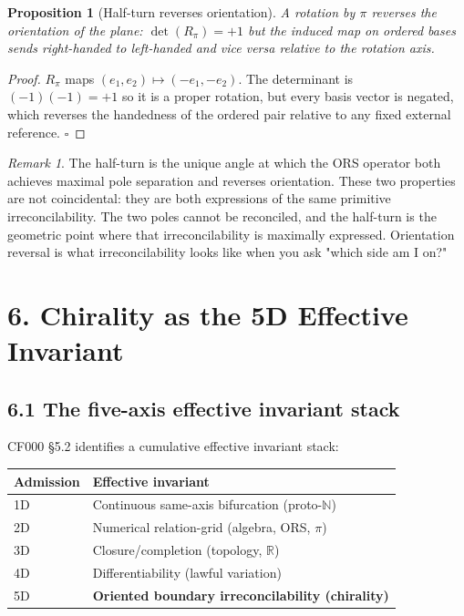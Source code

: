 \documentclass[11pt]{article}
\newtheorem{proposition}[theorem]{Proposition}
\theoremstyle{definition}
\theoremstyle{remark}
\newtheorem{remark}[theorem]{Remark}
\begin{document}
\begin{proposition}[Half-turn reverses orientation]
A rotation by $\pi$ reverses the orientation of the plane: $\det(R_\pi)=+1$
but the induced map on ordered bases sends right-handed to left-handed
and vice versa relative to the rotation axis.
\end{proposition}

\begin{proof}
$R_\pi$ maps $(e_1,e_2)\mapsto(-e_1,-e_2)$. The determinant is
$(-1)(-1)=+1$ so it is a proper rotation, but every basis vector is
negated, which reverses the handedness of the ordered pair relative
to any fixed external reference. $\square$
\end{proof}

\begin{remark}
The half-turn is the unique angle at which the ORS operator both
achieves maximal pole separation and reverses orientation. These two
properties are not coincidental: they are both expressions of the same
primitive irreconcilability. The two poles cannot be reconciled, and
the half-turn is the geometric point where that irreconcilability is
maximally expressed. Orientation reversal is what irreconcilability
looks like when you ask "which side am I on?"
\end{remark}

\section{6. Chirality as the 5D Effective Invariant}

\subsection{6.1 The five-axis effective invariant stack}

CF000 \S 5.2 identifies a cumulative effective invariant stack:

\begin{center}
\begin{tabular}{ll}
\toprule
Admission & Effective invariant \\
\midrule
1D & Continuous same-axis bifurcation (proto-$\mathbb{N}$) \\
2D & Numerical relation-grid (algebra, ORS, $\pi$) \\
3D & Closure/completion (topology, $\mathbb{R}$) \\
4D & Differentiability (lawful variation) \\
5D & \textbf{Oriented boundary irreconcilability (chirality)} \\
\bottomrule
\end{tabular}
\end{center}
\end{document}
